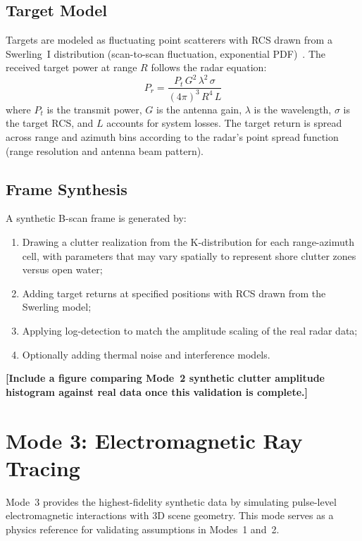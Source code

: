 \documentclass[conf]{new-aiaa}
\newcommand{\ph}[1]{\textbf{[#1]}}
\begin{document}
\subsection{Target Model}

Targets are modeled as fluctuating point scatterers with RCS drawn from a Swerling~I distribution (scan-to-scan fluctuation, exponential PDF)~\cite{swerling1960probability}. The received target power at range $R$ follows the radar equation:
\begin{equation}
P_r = \frac{P_t\, G^2\, \lambda^2\, \sigma}{(4\pi)^3\, R^4\, L}
\label{eq:radarequation}
\end{equation}
where $P_t$ is the transmit power, $G$ is the antenna gain, $\lambda$ is the wavelength, $\sigma$ is the target RCS, and $L$ accounts for system losses. The target return is spread across range and azimuth bins according to the radar's point spread function (range resolution and antenna beam pattern).

\subsection{Frame Synthesis}

A synthetic B-scan frame is generated by:
\begin{enumerate}
    \item Drawing a clutter realization from the K-distribution for each range-azimuth cell, with parameters that may vary spatially to represent shore clutter zones versus open water;
    \item Adding target returns at specified positions with RCS drawn from the Swerling model;
    \item Applying log-detection to match the amplitude scaling of the real radar data;
    \item Optionally adding thermal noise and interference models.
\end{enumerate}

\ph{Include a figure comparing Mode~2 synthetic clutter amplitude histogram against real data once this validation is complete.}

\section{Mode 3: Electromagnetic Ray Tracing}
\label{sec:mode3}

Mode~3 provides the highest-fidelity synthetic data by simulating pulse-level electromagnetic interactions with 3D scene geometry. This mode serves as a physics reference for validating assumptions in Modes~1 and~2.
\end{document}
